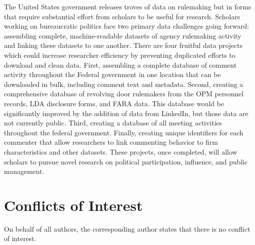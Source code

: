 \documentclass[
      12pt,
        ]{article}
\begin{document}
The United States government releases troves of data on rulemaking but
in forms that require substantial effort from scholars to be useful for
research. Scholars working on bureaucratic politics face two primary
data challenges going forward: assembling complete, machine-readable
datasets of agency rulemaking activity and linking these datasets to one
another. There are four fruitful data projects which could increase
researcher efficiency by preventing duplicated efforts to download and
clean data. First, assembling a complete database of comment activity
throughout the Federal government in one location that can be downloaded
in bulk, including comment text and metadata. Second, creating a
comprehensive database of revolving door rulemakers from the OPM
personnel records, LDA disclosure forms, and FARA data. This database
would be significantly improved by the addition of data from LinkedIn,
but those data are not currently public. Third, creating a database of
all meeting activities throughout the federal government. Finally,
creating unique identifiers for each commenter that allow researchers to
link commenting behavior to firm characteristics and other datasets.
These projects, once completed, will allow scholars to pursue novel
research on political participation, influence, and public management.

\hypertarget{conflicts-of-interest}{%
\section{Conflicts of Interest}\label{conflicts-of-interest}}

On behalf of all authors, the corresponding author states that there is
no conflict of interest.
\newpage
\singlespacing 
           
  
\end{document}
